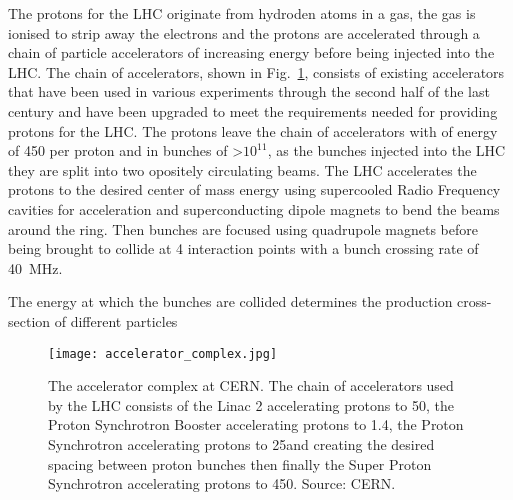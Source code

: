 The protons for the LHC originate from hydroden atoms in a gas, the gas is ionised to strip away the electrons and the protons are accelerated through a chain of particle accelerators of increasing energy before being injected into the LHC. The chain of accelerators, shown in Fig.~\ref{fig:accelerator_chain}, consists of existing accelerators that have been used in various experiments through the second half of the last century and have been upgraded to meet the requirements needed for providing protons for the LHC. 
The protons leave the chain of accelerators with of energy of 450 \gev per proton and in bunches of  >$10^{11}$, as the bunches injected into the LHC they are split into two opositely circulating beams.
The LHC accelerates the protons to the desired center of mass energy using supercooled Radio Frequency cavities for acceleration and superconducting dipole magnets to bend the beams around the ring. 
Then bunches are focused using quadrupole magnets before being brought to collide at 4 interaction points with a bunch crossing rate of 40~MHz. 

The energy at which the bunches are collided determines the production cross-section of different particles

\begin{figure}[htbp!] 
\centering    
\texttt{[image: accelerator\_complex.jpg]}
\caption{The accelerator complex at CERN. The chain of accelerators used by the LHC consists of the Linac 2 accelerating protons to 50\mev, the Proton Synchrotron Booster accelerating protons to 1.4\gev, the Proton Synchrotron accelerating protons to 25\gev and creating the desired spacing between proton bunches then finally the Super Proton Synchrotron accelerating protons to 450\gev. Source: CERN.}
\label{fig:accelerator_chain}
\end{figure}

